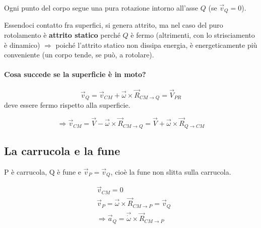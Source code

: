 \begin{osservazione}{}
Ogni punto del corpo segue una pura rotazione intorno all'asse $Q$ (se $\vec{v}_Q = 0$).
\end{osservazione}


Essendoci contatto fra superfici, si genera attrito, ma nel caso del puro rotolamento è \textbf{attrito statico} perché $Q$ è fermo (altrimenti, con lo strisciamento è dinamico) $\Rightarrow$ poiché l'attrito statico non dissipa energia, è energeticamente più conveniente (un corpo tende, se può, a rotolare).

\paragraph{Cosa succede se la superficie è in moto?}

\begin{equation}
\vec{v}_Q = \vec{v}_{CM} + \vec{\omega} \times \vec{R}_{CM \to Q} = \vec{V}_{PR}
\end{equation}
deve essere fermo rispetto alla superficie.

\begin{equation}
\Rightarrow \vec{v}_{CM} = \vec{V} - \vec{\omega} \times \vec{R}_{CM \to Q} = \vec{V} + \vec{\omega} \times \vec{R}_{Q \to CM}
\end{equation}

\subsection{La carrucola e la fune}

P è carrucola, Q è fune e $\vec{v}_P = \vec{v}_Q$, cioè la fune non slitta sulla carrucola.

\begin{align*}
&\vec{v}_{CM} = 0 \\
&\vec{v}_P = \vec{\omega} \times \vec{R}_{CM \to P} = \vec{v}_Q \\
&\Rightarrow \vec{a}_Q = \vec{\dot{\omega}} \times \vec{R}_{CM \to P}
\end{align*}
